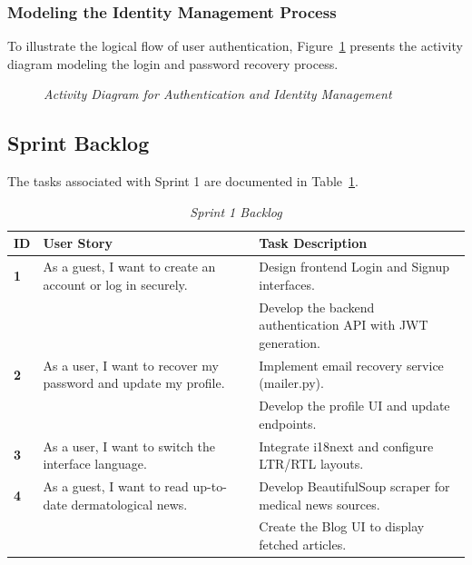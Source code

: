 \subsubsection{Modeling the Identity Management Process}
To illustrate the logical flow of user authentication, Figure~\ref{fig:sprint1_activity} presents the activity diagram modeling the login and password recovery process.

\begin{figure}[H]
    \centering
    \caption{\textit{Activity Diagram for Authentication and Identity Management}}
    \label{fig:sprint1_activity}
\end{figure}

\subsection{Sprint Backlog}
The tasks associated with Sprint 1 are documented in Table~\ref{tab:sprint1_backlog}.

\begin{table}[H]
    \centering
    \small
    \renewcommand{\arraystretch}{1.2}
    \begin{tabular}{|>{\centering\arraybackslash}p{0.8cm}|>{\raggedright\arraybackslash}p{4.5cm}|>{\raggedright\arraybackslash}p{6.8cm}|}
    \hline
    \rowcolor[HTML]{1F3864}
    {\color{white}\textbf{ID}} & {\color{white}\textbf{User Story}} & {\color{white}\textbf{Task Description}} \\
    \hline
    \textbf{1} & As a guest, I want to create an account or log in securely. & Design frontend Login and Signup interfaces. \\
    \cline{3-3}
     & & Develop the backend authentication API with JWT generation. \\
    \hline
    \textbf{2} & As a user, I want to recover my password and update my profile. & Implement email recovery service (mailer.py). \\
    \cline{3-3}
     & & Develop the profile UI and update endpoints. \\
    \hline
    \textbf{3} & As a user, I want to switch the interface language. & Integrate i18next and configure LTR/RTL layouts. \\
    \hline
    \textbf{4} & As a guest, I want to read up-to-date dermatological news. & Develop BeautifulSoup scraper for medical news sources. \\
    \cline{3-3}
     & & Create the Blog UI to display fetched articles. \\
    \hline
    \end{tabular}
    \caption{\textit{Sprint 1 Backlog}}
    \label{tab:sprint1_backlog}
\end{table}

